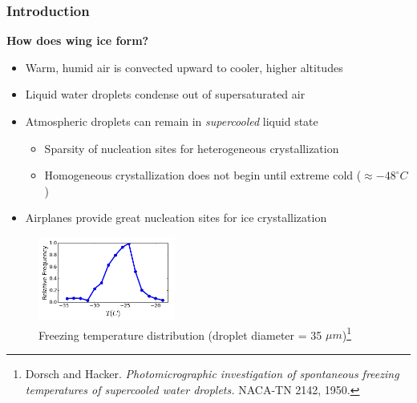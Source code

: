 \documentclass[9pt]{beamer}
\begin{document}
\begin{frame}
\frametitle{Introduction}
\label{sec-1-5}

\textbf{How does wing ice form?}
\begin{itemize}
\item Warm, humid air is convected upward to cooler, higher altitudes
\item Liquid water droplets condense out of supersaturated air
\item Atmospheric droplets can remain in \emph{supercooled} liquid state
\begin{itemize}
\item Sparsity of nucleation sites for heterogeneous crystallization
\item Homogeneous crystallization does not begin until extreme cold ($\approx -48^\circ C$)
\end{itemize}
\item Airplanes provide great nucleation sites for ice crystallization
\end{itemize}
\vspace*{-0.0cm}\begin{figure}
      \includegraphics[width=0.4\textwidth]{DropletFreezingIntro.png}
      \caption{Freezing temperature distribution (droplet diameter =
      35 $\mu m$)\footnote{\tiny Dorsch and
      Hacker. \emph{Photomicrographic investigation of spontaneous
      freezing temperatures of supercooled water droplets.} NACA-TN
      2142, 1950.}} 
\end{figure}
\end{frame}
\end{document}

